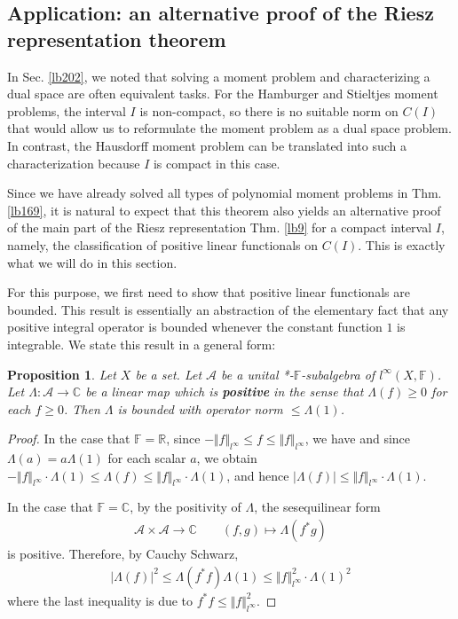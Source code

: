 \documentclass[12pt,b5paper,notitlepage]{article}
\theoremstyle{definition}
\theoremstyle{plain}
\newtheorem{pp}[df]{Proposition}
\newcommand{\scr}{\mathscr}
\newcommand{\Cbb}{\mathbb C}
\newcommand{\Rbb}{\mathbb R}
\newcommand{\Fbb}{\mathbb F}
\numberwithin{equation}{section}
\begin{document}
\subsection{Application: an alternative proof of the Riesz representation theorem}\label{lb244}


In Sec. \ref{lb202}, we noted that solving a moment problem and characterizing a dual space are often equivalent tasks. For the Hamburger and Stieltjes moment problems, the interval $I$ is non-compact, so there is no suitable norm on $C(I)$ that would allow us to reformulate the moment problem as a dual space problem. In contrast, the Hausdorff moment problem can be translated into such a characterization because $I$ is compact in this case.

Since we have already solved all types of polynomial moment problems in Thm. \ref{lb169}, it is natural to expect that this theorem also yields an alternative proof of the main part of the Riesz representation Thm. \ref{lb9} for a compact interval
$I$, namely, the classification of positive linear functionals on 
$C(I)$. This is exactly what we will do in this section.

For this purpose, we first need to show that positive linear functionals are bounded. This result is essentially an abstraction of the elementary fact that any positive integral operator is bounded whenever the constant function $1$ is integrable. We state this result in a general form:



\begin{pp}\label{lb204}
Let $X$ be a set. Let $\scr A$ be a unital *-$\Fbb$-subalgebra of $l^\infty(X,\Fbb)$.  Let $\Lambda:\scr A\rightarrow\Cbb$ be a linear map which is \textbf{positive} in the sense that $\Lambda(f)\geq0$ for each $f\geq0$. Then $\Lambda$ is bounded with operator norm $\leq \Lambda(1)$. 
\end{pp}




\begin{proof}
In the case that $\Fbb=\Rbb$, since $-\Vert f\Vert_{l^\infty}\leq f\leq\Vert f\Vert_{l^\infty}$, we have and since $\Lambda(a)=a\Lambda(1)$ for each scalar $a$, we obtain $-\Vert f\Vert_{l^\infty}\cdot\Lambda(1)\leq \Lambda(f)\leq\Vert f\Vert_{l^\infty}\cdot\Lambda(1)$, and hence $|\Lambda(f)|\leq\Vert f\Vert_{l^\infty}\cdot\Lambda(1)$.

In the case that $\Fbb=\Cbb$, by the positivity of $\Lambda$, the sesequilinear form
\begin{align*}
\scr A\times\scr A\rightarrow\Cbb\qquad (f,g)\mapsto \Lambda(f^*g)
\end{align*}
is positive. Therefore, by Cauchy Schwarz,
\begin{align*}
|\Lambda(f)|^2\leq\Lambda(f^*f)\Lambda(1)\leq\Vert f\Vert_{l^\infty}^2\cdot\Lambda(1)^2
\end{align*}
where the last inequality is due to $f^*f\leq \Vert f\Vert_{l^\infty}^2$. 
\end{proof}
\end{document}
